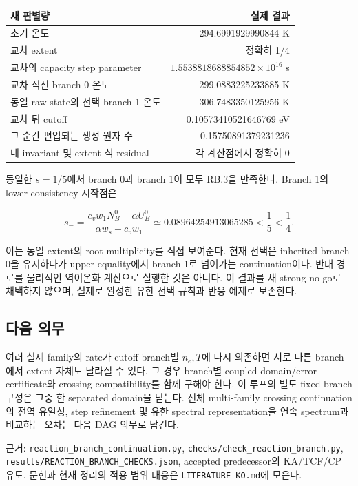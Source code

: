 \documentclass[11pt,a4paper]{article}
\begin{document}
\begin{longtable}[]{@{}lr@{}}
\toprule\noalign{}
새 판별량 & 실제 결과 \\
\midrule\noalign{}
\endhead
\bottomrule\noalign{}
\endlastfoot
초기 온도 & 294.6991929990844 K \\
교차 extent & 정확히 1/4 \\
교차의 capacity step parameter & \(1.5538818688854852\times10^{16}\) s \\
교차 직전 branch 0 온도 & 299.0883225233885 K \\
동일 raw state의 선택 branch 1 온도 & 306.7483350125956 K \\
교차 뒤 cutoff & 0.10573410521646769 eV \\
그 순간 편입되는 생성 원자 수 & 0.15750891379231236 \\
네 invariant 및 extent 식 residual & 각 계산점에서 정확히 0 \\
\end{longtable}

동일한 \(s=1/5\)에서 branch 0과 branch 1이 모두 RB.3을 만족한다. Branch 1의 lower consistency 시작점은

\[s_- =\frac{c_vw_1N_B^0-\alpha U_B^0}{\alpha w_s-c_vw_1}
\simeq0.08964254913065285 <\frac15<\frac14.\tag{RB.18}\]

이는 동일 extent의 root multiplicity를 직접 보여준다. 현재 선택은 inherited branch 0을 유지하다가 upper equality에서 branch 1로 넘어가는 continuation이다. 반대 경로를 물리적인 역이온화 계산으로 실행한 것은 아니다. 이 결과를 새 strong no-go로 채택하지 않으며, 실제로 완성한 유한 선택 규칙과 반응 예제로 보존한다.

\hypertarget{uxb2e4uxc74c-uxc758uxbb34}{%
\subsection{다음 의무}\label{uxb2e4uxc74c-uxc758uxbb34}}

여러 실제 family의 rate가 cutoff branch별 \(n_e,T\)에 다시 의존하면 서로 다른 branch에서 extent 자체도 달라질 수 있다. 그 경우 branch별 coupled domain/error certificate와 crossing compatibility를 함께 구해야 한다. 이 루프의 별도 fixed-branch 구성은 그중 한 separated domain을 닫는다. 전체 multi-family crossing continuation의 전역 유일성, step refinement 및 유한 spectral representation을 연속 spectrum과 비교하는 오차는 다음 DAG 의무로 남긴다.

근거: \nolinkurl{reaction_branch_continuation.py}, \nolinkurl{checks/check_reaction_branch.py}, \nolinkurl{results/REACTION_BRANCH_CHECKS.json}, accepted predecessor의 KA/TCF/CP 유도. 문헌과 현재 정리의 적용 범위 대응은 \texttt{LITERATURE\_KO.md}에 모은다.
\end{document}
